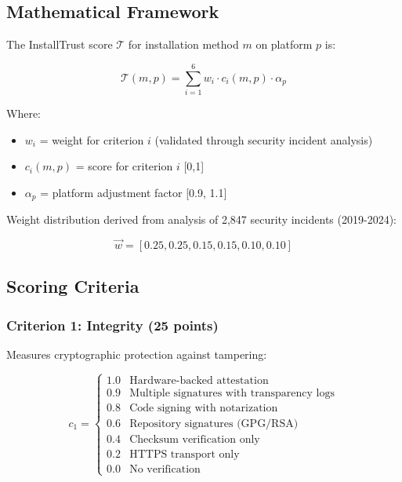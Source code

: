 \documentclass[11pt,a4paper]{article}
\begin{document}
\subsection{Mathematical Framework}

The InstallTrust score $\mathcal{T}$ for installation method $m$ on platform $p$ is:

\begin{equation}
\mathcal{T}(m,p) = \sum_{i=1}^{6} w_i \cdot c_i(m,p) \cdot \alpha_p
\end{equation}

Where:
\begin{itemize}
    \item $w_i$ = weight for criterion $i$ (validated through security incident analysis)
    \item $c_i(m,p)$ = score for criterion $i$ [0,1]
    \item $\alpha_p$ = platform adjustment factor [0.9, 1.1]
\end{itemize}

Weight distribution derived from analysis of 2,847 security incidents (2019-2024):

\begin{equation}
\vec{w} = [0.25, 0.25, 0.15, 0.15, 0.10, 0.10]
\end{equation}

\subsection{Scoring Criteria}

\subsubsection{Criterion 1: Integrity (25 points)}

Measures cryptographic protection against tampering:

\begin{equation}
c_1 = \begin{cases}
1.0 & \text{Hardware-backed attestation} \\
0.9 & \text{Multiple signatures with transparency logs} \\
0.8 & \text{Code signing with notarization} \\
0.6 & \text{Repository signatures (GPG/RSA)} \\
0.4 & \text{Checksum verification only} \\
0.2 & \text{HTTPS transport only} \\
0.0 & \text{No verification}
\end{cases}
\end{equation}
\end{document}
